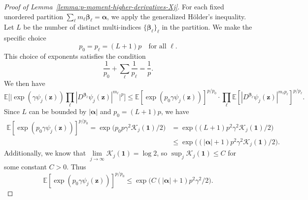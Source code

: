 \documentclass[12pt]{amsart}
\theoremstyle{definition}
\theoremstyle{remark}
\newcommand{\bz}{\boldsymbol{z}}
\newcommand{\E}{\mathbb{E}}
\numberwithin{equation}{section}
\begin{document}
\begin{proof}[Proof of Lemma~\ref{lemma:p-moment-higher-derivatives-Xj}]
For each fixed unordered partition $\sum_\ell m_\ell \boldsymbol{\beta}_\ell=\boldsymbol{\alpha}$, we apply the generalized H\"{o}lder's inequality. Let $L$ be the number of distinct multi-indices $\{\boldsymbol{\beta}_\ell\}_{\ell}$ in the partition. We make the specific choice
\[
p_0 = p_\ell = (L+1)p \quad \text{for all } \ell.
\]
This choice of exponents satisfies the condition 
\[
\frac{1}{p_0} + \sum_{\ell} \frac{1}{p_\ell} = \frac{1}{p}.
\]
We then have
\[
\E\Big[\big|\exp(\gamma\psi_j(\bz))\prod_{\ell} |D^{\boldsymbol{\beta}_\ell}\psi_j(\bz)|^{m_\ell}\big|^p\Big]\le \E[\exp(p_0\gamma\psi_j(\bz))]^{p/p_0}\cdot\prod_\ell \E[|D^{\boldsymbol{\beta}_\ell}\psi_j(\bz)|^{m_\ell p_\ell}]^{p/p_\ell}.
\]
Since $L$ can be bounded by $|\boldsymbol{\alpha}|$ and $p_0=(L+1)p$, we have
\begin{align*}
\E[\exp(p_0\gamma\psi_j(\bz))]^{p/p_0}=\exp\Big(p_0p\gamma^2\mathcal{K}_j(\boldsymbol{1})/2\Big)&=\exp\Big((L+1)p^2\gamma^2\mathcal{K}_j(\boldsymbol{1})/2\Big)\\
&\le \exp\Big((|\boldsymbol{\alpha}|+1)p^2\gamma^2\mathcal{K}_j(\boldsymbol{1})/2\Big).
\end{align*}
Additionally, we know that $\lim\limits_{j\to \infty}\mathcal{K}_j(\boldsymbol{1})=\log 2$, so $\sup_j \mathcal{K}_j(\boldsymbol{1})\le C$ for some constant $C>0$. Thus
\[
\E[\exp(p_0\gamma\psi_j(\bz))]^{p/p_0}\le \exp\Big(C(|\boldsymbol{\alpha}|+1)p^2\gamma^2/2\Big).
\]


\end{proof}
\end{document}
